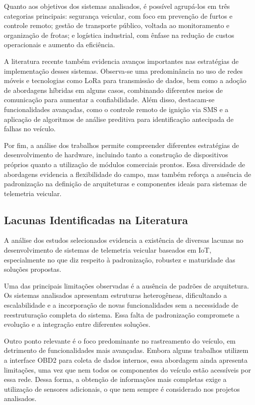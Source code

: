 \documentclass[
	article,			%
	11pt,				%
	oneside,			%
	a4paper,			%
	english,			%
	brazil,				%
	sumario=tradicional
	]{abntex2}
\begin{document}
Quanto aos objetivos dos sistemas analisados, é possível agrupá-los em três categorias principais: segurança veicular, com foco em prevenção de furtos e controle remoto; gestão de transporte público, voltada ao monitoramento e organização de frotas; e logística industrial, com ênfase na redução de custos operacionais e aumento da eficiência.

A literatura recente também evidencia avanços importantes nas estratégias de implementação desses sistemas. Observa-se uma predominância no uso de redes móveis e tecnologias como LoRa para transmissão de dados, bem como a adoção de abordagens híbridas em alguns casos, combinando diferentes meios de comunicação para aumentar a confiabilidade. Além disso, destacam-se funcionalidades avançadas, como o controle remoto de ignição via SMS e a aplicação de algoritmos de análise preditiva para identificação antecipada de falhas no veículo.

Por fim, a análise dos trabalhos permite compreender diferentes estratégias de desenvolvimento de hardware, incluindo tanto a construção de dispositivos próprios quanto a utilização de módulos comerciais prontos. Essa diversidade de abordagens evidencia a flexibilidade do campo, mas também reforça a ausência de padronização na definição de arquiteturas e componentes ideais para sistemas de telemetria veicular.

\subsection{Lacunas Identificadas na Literatura}

A análise dos estudos selecionados evidencia a existência de diversas lacunas no desenvolvimento de sistemas de telemetria veicular baseados em IoT, especialmente no que diz respeito à padronização, robustez e maturidade das soluções propostas.

Uma das principais limitações observadas é a ausência de padrões de arquitetura. Os sistemas analisados apresentam estruturas heterogêneas, dificultando a escalabilidade e a incorporação de novas funcionalidades sem a necessidade de reestruturação completa do sistema. Essa falta de padronização compromete a evolução e a integração entre diferentes soluções.

Outro ponto relevante é o foco predominante no rastreamento do veículo, em detrimento de funcionalidades mais avançadas. Embora alguns trabalhos utilizem a interface OBD2 para coleta de dados internos, essa abordagem ainda apresenta limitações, uma vez que nem todos os componentes do veículo estão acessíveis por essa rede. Dessa forma, a obtenção de informações mais completas exige a utilização de sensores adicionais, o que nem sempre é considerado nos projetos analisados.
\end{document}
